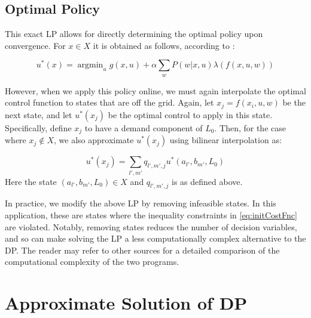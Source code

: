 \documentclass[conference]{IEEEtran}
\DeclareMathOperator*{\argmin}{argmin}
\begin{document}
\subsection{Optimal Policy}
This exact LP allows for directly determining the optimal policy upon convergence. For $x\in X$ it is obtained as follows, according to \cite{Bertsekas:2007:DPO:1396348}:

\begin{equation}
    u^{*}(x)=\argmin_{u} g(x,u)+\alpha \sum_{w} P(w|x,u)\lambda(f(x,u,w))
\end{equation}

However, when we apply this policy online, we must again interpolate the optimal control function to states that are off the grid. Again, let $x_{j}=f(x_{i}, u, w)$ be the next state, and let $u^{*}(x_{j})$ be the optimal control to apply in this state. Specifically, define $x_{j}$ to have a demand component of $L_{0}$. Then, for the case where $x_{j}\not\in X$, we also approximate $u^{*}(x_{j})$ using bilinear interpolation as:

\begin{equation}
    u^{*}(x_{j})=\sum_{l',m'}q_{l',m',j}u^{*}(a_{l'},b_{m'},L_{0})
\end{equation} Here the state $(a_{l'},b_{m'},L_{0})\in X$ and $q_{l',m',j}$ is as defined above.


In practice, we modify the above LP by removing infeasible states. In this application, these are states where the inequality constraints in \eqref{eq:initCostFnc} are violated. Notably, removing states reduces the number of decision variables, and so can make solving the LP a less computationally complex alternative to the DP. The reader may refer to other sources for a detailed comparison of the computational complexity of the two programs.




\section{Approximate Solution of DP}
\end{document}
